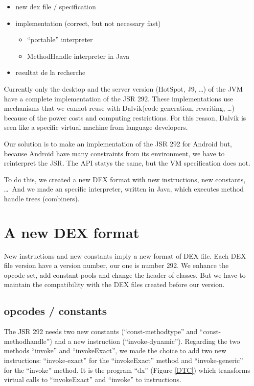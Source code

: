 \documentclass{sig-alternate}
\def \DALVIK{Dalvik\xspace}
\def \Jsr{JSR\xspace}
\def \JSR{\Jsr 292\xspace}
\begin{document}
  {\color{red}
    \begin{itemize}
      \item new dex file / specification
      \item implementation (correct, but not necessary fast)
            \begin{itemize}
              \item ``portable'' interpreter
              \item MethodHandle interpreter in Java
            \end{itemize}
      \item resultat de la recherche
    \end{itemize}%
  }
  Currently only the desktop and the server version (HotSpot, J9, \dots) of the JVM have a complete implementation of the JSR 292.
  These implementations use mechanisms that we cannot reuse with \DALVIK (code generation, rewriting, \dots)
  because of the power costs and computing restrictions.
  For this reason, \DALVIK is seen like a specific virtual machine from language developers.
    
  Our solution is to make an implementation of the JSR 292 for Android but,
  because Android have many constraints from its environment,
  we have to reinterpret the JSR.
  The API statys the same, but the VM specification does not.
    
  To do this, we created a new DEX format with new instructions, new constants,
  \dots~And we made an specific interpreter, written in Java, which executes method handle trees (combiners).

\section{A new DEX format}

  New instructions and new constants imply a new format of DEX file.
  Each DEX file version have a version number, our one is number 292.
  We enhance the opcode set, add constant-pools and change the header of classes.
  But we have to maintain the compatibility with the DEX files created before our version.

  \subsection{opcodes / constants}
    The \JSR needs two new constants (``const-methodtype'' and ``const-methodhandle'') and a new instruction (``invoke-dynamic'').
    Regarding the two methods ``invoke'' and ``invokeExact'', we made the choice to add two new instructions:
    ``invoke-exact'' for the ``invokeExact'' method and ``invoke-generic'' for the ``invoke'' method.
    It is the program ``dx'' (Figure \ref{DTC}) which transforms virtual calls to ``invokeExact'' and ``invoke'' to instructions.
\end{document}
